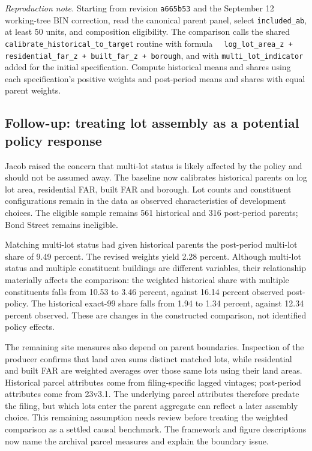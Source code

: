 \textit{Reproduction note.} Starting from revision \texttt{a665b53} and the
September 12 working-tree BIN correction, read the canonical parent panel,
select \texttt{included\_ab}, at least 50 units, and composition eligibility.
The comparison calls the shared \texttt{calibrate\_historical\_to\_target}
routine with formula
\texttt{\string~ log\_lot\_area\_z + residential\_far\_z + built\_far\_z + borough},
and with \texttt{multi\_lot\_indicator} added for the initial specification.
Compute historical means and shares using each specification's positive
weights and post-period means and shares with equal parent weights.

\clearpage
\subsection*{Follow-up: treating lot assembly as a potential policy response}

Jacob raised the concern that multi-lot status is likely affected by the
policy and should not be assumed away. The baseline now calibrates historical
parents on log lot area, residential FAR, built FAR and borough. Lot counts
and constituent configurations remain in the data as observed characteristics
of development choices. The eligible sample remains 561 historical and 316
post-period parents; Bond Street remains ineligible.

Matching multi-lot status had given historical parents the post-period
multi-lot share of 9.49 percent. The revised weights yield 2.28 percent.
Although multi-lot status and multiple constituent buildings are different
variables, their relationship materially affects the comparison: the weighted
historical share with multiple constituents falls from 10.53 to 3.46 percent,
against 16.14 percent observed post-policy. The historical exact-99 share
falls from 1.94 to 1.34 percent, against 12.34 percent observed. These are
changes in the constructed comparison, not identified policy effects.

The remaining site measures also depend on parent boundaries. Inspection of
the producer confirms that land area sums distinct matched lots, while
residential and built FAR are weighted averages over those same lots using
their land areas. Historical parcel attributes come from filing-specific
lagged vintages; post-period attributes come from 23v3.1. The underlying
parcel attributes therefore predate the filing, but which lots enter the
parent aggregate can reflect a later assembly choice. This remaining
assumption needs review before treating the weighted comparison as a settled
causal benchmark. The framework and figure descriptions now name the archival
parcel measures and explain the boundary issue.

